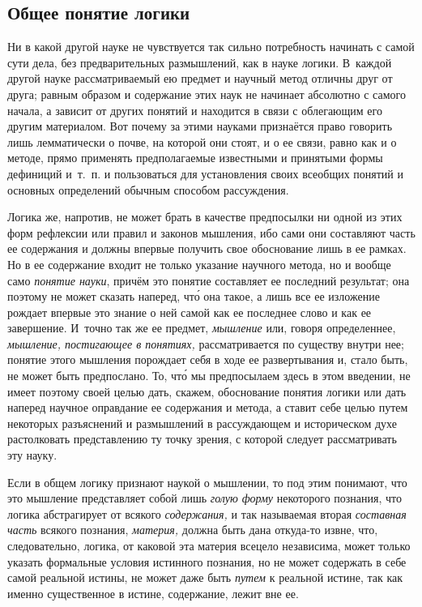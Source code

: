 \subsection[Общее понятие логики]{Общее понятие логики}
Ни в какой другой науке не чувствуется так
сильно потребность начинать с самой сути дела, без предварительных
размышлений, как в науке логики. В~каждой другой науке рассматриваемый ею
предмет и научный метод отличны друг от друга; равным образом и содержание
этих наук не начинает абсолютно с самого начала, а зависит от других
понятий и находится в связи с облегающим его другим материалом. Вот почему за этими
науками признаётся право говорить лишь
лемматически о почве, на которой они стоят, и о ее связи, равно как и о
методе, прямо применять предполагаемые известными и
принятыми формы дефиниций и~т.~п. и пользоваться для установления своих
всеобщих понятий и основных определений обычным способом рассуждения.

Логика же, напротив, не может брать в качестве предпосылки ни одной из этих
форм рефлексии или правил и законов мышления, ибо сами они составляют часть
ее содержания и должны впервые получить свое обоснование лишь в ее рамках.
Но в ее содержание входит не только указание научного метода, но и вообще
само {\em понятие науки}, причём это понятие
составляет ее последний результат; она поэтому не может сказать наперед,
чт\'{о} она такое, а лишь все ее изложение рождает впервые это знание о ней
самой как ее последнее слово и как ее завершение. И~точно так же ее
предмет, {\em мышление} или, говоря определеннее,
{\em мышление, постигающее в понятиях,} рассматривается
по существу внутри нее; понятие этого мышления порождает себя в ходе ее
развертывания и, стало быть, не может быть предпослано. То, чт\'{о} мы
предпосылаем здесь в этом введении, не имеет поэтому своей целью дать,
скажем, обоснование понятия логики или дать наперед научное оправдание ее
содержания и метода, а ставит себе целью путем некоторых разъяснений и
размышлений в рассуждающем и историческом духе растолковать представлению
ту точку зрения, с которой следует рассматривать эту науку.

Если в общем логику признают наукой о мышлении, то под этим понимают, что
это мышление представляет собой лишь {\em голую форму}
некоторого познания, что логика абстрагирует от всякого
{\em содержания,} и так называемая вторая
{\em составная часть} всякого познания,
{\em материя,} должна быть дана откуда-то извне, что,
следовательно, логика, от каковой эта материя всецело независима, может
только указать формальные условия истинного познания, но не может содержать
в себе самой реальной истины, не может даже быть
{\em путем} к реальной истине, так как именно
существенное в истине, содержание, лежит вне ее.

